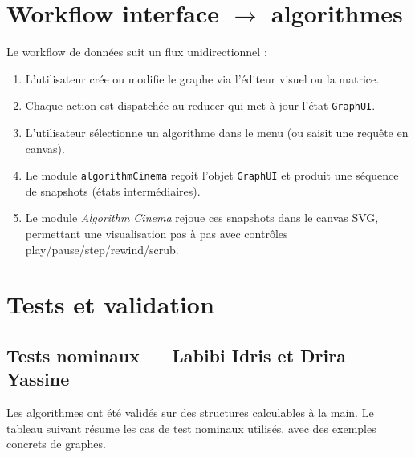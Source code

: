 \documentclass[a4paper,12pt]{report}
\begin{document}
\section*{Workflow interface $\rightarrow$ algorithmes}
 

Le workflow de données suit un flux unidirectionnel :

\begin{enumerate}
    \item L'utilisateur crée ou modifie le graphe via l'éditeur visuel ou la matrice.
    \item Chaque action est dispatchée au reducer qui met à jour l'état \texttt{GraphUI}.
    \item L'utilisateur sélectionne un algorithme dans le menu (ou saisit une requête en canvas).
    \item Le module \texttt{algorithmCinema} reçoit l'objet \texttt{GraphUI} et produit une séquence
          de snapshots (états intermédiaires).
    \item Le module \textit{Algorithm Cinema} rejoue ces snapshots dans le canvas SVG,
          permettant une visualisation pas à pas avec contrôles play/pause/step/rewind/scrub.
\end{enumerate}

\bigskip
 
 
\section{Tests et validation}
 
\subsection{Tests nominaux — Labibi Idris et Drira Yassine}
 
Les algorithmes ont été validés sur des structures calculables à la main. Le tableau
suivant résume les cas de test nominaux utilisés, avec des exemples concrets de graphes.
\end{document}
